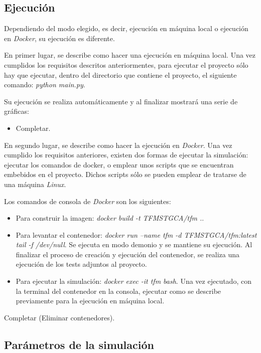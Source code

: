 \subsection{Ejecución}

Dependiendo del modo elegido, es decir, ejecución en máquina local o ejecución en \textit{Docker}, su ejecución es diferente.

En primer lugar, se describe como hacer una ejecución en máquina local. Una vez cumplidos los requisitos descritos anteriormentes,
para ejecutar el proyecto sólo hay que ejecutar, dentro del directorio que contiene el proyecto, el siguiente comando:
\textit{python main.py}.

Su ejecución se realiza automáticamente y al finalizar mostrará una serie de gráficas:

\begin{itemize}
  \item Completar.
\end{itemize}

En segundo lugar, se describe como hacer la ejecución en \textit{Docker}. Una vez cumplido los requisitos anteriores, existen dos
formas de ejecutar la simulación: ejecutar los comandos de docker, o emplear unos scripts que se encuentran embebidos en el proyecto.
Dichos scripts sólo se pueden emplear de tratarse de una máquina \textit{Linux}.

Los comandos de consola de \textit{Docker} son los siguientes:

\begin{itemize}
  \item Para construir la imagen: \textit{docker build -t TFMSTGCA/tfm .}.
  \item Para levantar el contenedor: \textit{docker run --name tfm -d TFMSTGCA/tfm:latest tail -f /dev/null}. Se ejecuta en modo demonio y se mantiene su
  ejecución. Al finalizar el proceso de creación y ejecución del contenedor, se realiza una ejecución de los tests adjuntos al proyecto.
  \item Para ejecutar la simulación: \textit{docker exec -it tfm bash}. Una vez ejecutado, con la terminal del contenedor en la consola, ejecutar como se describe previamente
  para la ejecución en máquina local.
\end{itemize}

Completar (Eliminar contenedores).

\subsection{Parámetros de la simulación}
